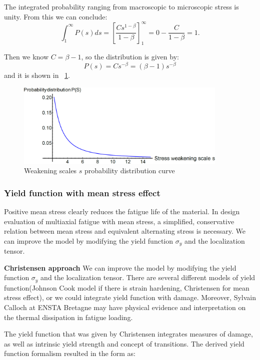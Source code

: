 \documentclass[3p,times,procedia,number]{elsarticle}
\newcommand{\figref}[1]{\figurename~\ref{#1}}
\begin{document}
The integrated probability ranging from macroscopic to microscopic stress  is unity. From this we can conclude:
$$\int_{1}^{\infty}P(s)ds=\left[ \frac{Cs^{1-\beta}}{1-\beta}\right] _{1}^{\infty}=0-\frac{C}{1-\beta}=1.$$


Then we know $C=\beta-1$, so the distribution is given by:
$$P(s) = Cs^{-\beta}=(\beta-1)s^{-\beta}$$ and it is shown in \figref{ps}.
\begin{figure}[!h]
	\centering
	\includegraphics[width=0.9\textwidth]{figures//ps.png} 
	\caption{Weakening scales $s$ probability distribution curve}
	\label{ps}
\end{figure}


\subsubsection{Yield function with mean stress effect}

Positive mean stress clearly reduces the fatigue life of the material. In design evaluation of multiaxial fatigue with mean stress, a simplified, conservative relation between mean stress and equivalent alternating stress is necessary. We can improve the model by modifying the yield function $\sigma_y$ and the localization tensor.

\textbf{Christensen approach}
We can improve the model by modifying the yield function $\sigma_y$ and the localization tensor. There are several different models of yield function(Johnson Cook model if there is strain hardening, Christensen for mean stress effect), or we could integrate yield function with damage. Moreover, Sylvain Calloch at ENSTA Bretagne may have physical evidence and interpretation on the thermal dissipation in fatigue loading. 

The yield function that was given by Christensen\cite{christensen2000yield} integrates measures of damage, as well as intrinsic yield strength and concept of transitions. The derived yield function formalism resulted in the form as:
\end{document}
